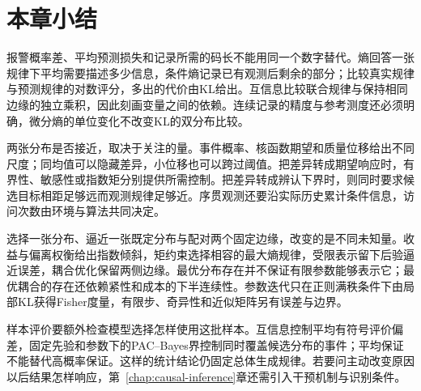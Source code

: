 \section{本章小结}
\label{sec:information-theory-statistical-geometry-summary}

报警概率差、平均预测损失和记录所需的码长不能用同一个数字替代。熵回答一张规律下平均需要描述多少信息，条件熵记录已有观测后剩余的部分；比较真实规律与预测规律的对数评分，多出的代价由KL给出。互信息比较联合规律与保持相同边缘的独立乘积，因此刻画变量之间的依赖。连续记录的精度与参考测度还必须明确，微分熵的单位变化不改变KL的双分布比较。

两张分布是否接近，取决于关注的量。事件概率、核函数期望和质量位移给出不同尺度；同均值可以隐藏差异，小位移也可以跨过阈值。把差异转成期望响应时，有界性、敏感性或指数矩分别提供所需控制。把差异转成辨认下界时，则同时要求候选目标相距足够远而观测规律足够近。序贯观测还要沿实际历史累计条件信息，访问次数由环境与算法共同决定。

选择一张分布、逼近一张既定分布与配对两个固定边缘，改变的是不同未知量。收益与偏离权衡给出指数倾斜，矩约束选择相容的最大熵规律，受限表示留下后验逼近误差，耦合优化保留两侧边缘。最优分布存在并不保证有限参数能够表示它；最优耦合的存在还依赖紧性和成本的下半连续性。参数迭代只在正则满秩条件下由局部KL获得Fisher度量，有限步、奇异性和近似矩阵另有误差与边界。

样本评价要额外检查模型选择怎样使用这批样本。互信息控制平均有符号评价偏差，固定先验和参数下的PAC--Bayes界控制同时覆盖候选分布的事件；平均保证不能替代高概率保证。这样的统计结论仍固定总体生成规律。若要问主动改变原因以后结果怎样响应，第~\ref{chap:causal-inference}章还需引入干预机制与识别条件。
